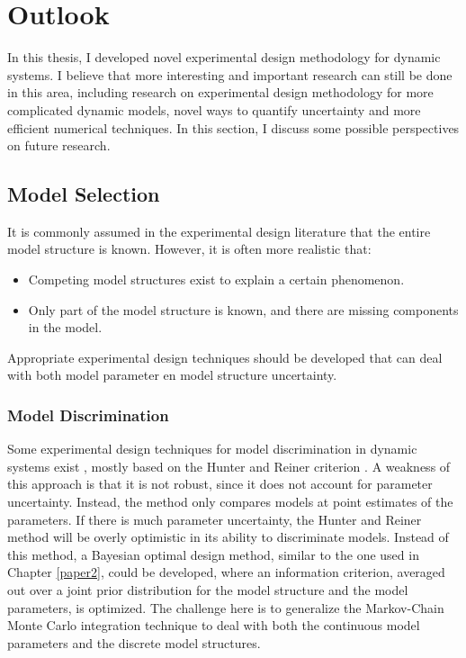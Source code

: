 \section{Outlook}
In this thesis, I developed novel experimental design methodology for dynamic systems. I believe that more interesting and important research can still be done in this area, including research on experimental design methodology for more complicated dynamic models, novel ways to quantify uncertainty and more efficient numerical techniques. In this section, I discuss some possible perspectives on future research.
\subsection{Model Selection}
It is commonly assumed in the experimental design literature that the entire model structure is known. However, it is often more realistic that:
\begin{itemize}
\item Competing model structures exist to explain a certain phenomenon.
\item Only part of the model structure is known, and there are missing components in the model.
\end{itemize}
Appropriate experimental design techniques should be developed that can deal with both model parameter en model structure uncertainty.
\subsubsection{Model Discrimination}
Some experimental design techniques for model discrimination in dynamic systems exist \parencite{chen}, mostly based on the Hunter and Reiner criterion \parencite{hunter}. A weakness of this approach is that it is not robust, since it does not account for parameter uncertainty. Instead, the method only compares models at point estimates of the parameters. If there is much parameter uncertainty, the Hunter and Reiner method will be overly optimistic in its ability to discriminate models. Instead of this method, a Bayesian optimal design method, similar to the one used in Chapter \ref{paper2}, could be developed, where an information criterion, averaged out over a joint prior distribution for the model structure and the model parameters, is optimized. The challenge here is to generalize the Markov-Chain Monte Carlo integration technique to deal with both the continuous model parameters and the discrete model structures. 
